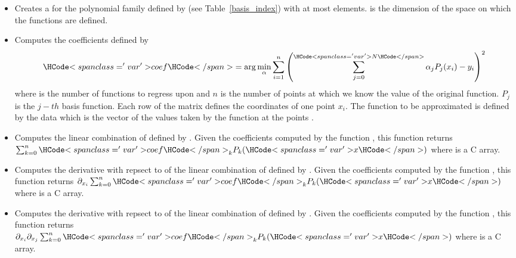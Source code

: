 \begin{itemize}
  \item {}
  \sshortdescribe Creates a  for the polynomial family
  defined by  (see Table~\ref{basis_index}) with at most 
  elements.  is the dimension of the space on which the functions are
  defined.

\item {}
  \sshortdescribe Computes the coefficients  defined by
  \begin{equation*}
    \var{coef} = \arg\min_\alpha \sum_{i=1}^n
    \left( \sum_{j=0}^{\var{N}} \alpha_j  P_j(x_i) - y_i\right)^2
  \end{equation*}
  where  is the number of functions to regress upon and $n$ is the
  number of points at which we know the value of the original function. $P_j$
  is the $j-th$ basis function. Each row of the matrix  defines the
  coordinates of one point $x_i$. The function to be approximated is defined
  by the data  which is the vector of the values taken by the function
  at the points .
  
\item {}
  \sshortdescribe Computes the linear combination of  defined by
  . Given the coefficients computed by the function
  , this function returns $\sum_{k=0}^n
  \var{coef}_k  P_k(\var{x})$ where  is a C array.

\item {}
  \sshortdescribe Computes the derivative with repsect to  of the
  linear combination of  defined by . Given the
  coefficients computed by the function , this
  function returns $\partial_{x_i} \sum_{k=0}^n \var{coef}_k  P_k(\var{x})$
  where  is a C array.

\item {}
  \sshortdescribe Computes the derivative with repsect to  of the
  linear combination of  defined by . Given the
  coefficients computed by the function , this
  function returns $\partial_{x_i} \partial_{x_j} \sum_{k=0}^n \var{coef}_k  P_k(\var{x})$
  where  is a C array.
\end{itemize}


